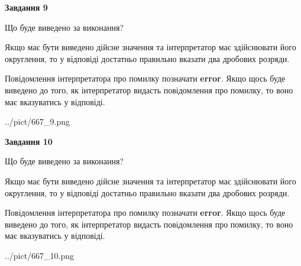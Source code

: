 \documentclass[12pt, ukrainian]{article}
\begin{document}
{\begin {Large}
{\begin {center}\textbf{Завдання 9}\end {center}}\par
Що буде виведено за виконання? \par

Якщо має бути виведено дійсне значення та інтерпретатор має здійснювати його округлення, 
то у відповіді достатньо правильно вказати два дробових розряди.

Повідомлення інтерпретатора про помилку позначати \textbf{error}.
Якщо щось буде виведено до того, як інтерпретатор видасть повідомлення про помилку, 
то воно має вказуватись у відповіді. \par

\begin{center}
	{../pict/667_9.png}
\end{center}
\newpage

{\begin {center}\textbf{Завдання 10}\end {center}}\par
Що буде виведено за виконання? \par

Якщо має бути виведено дійсне значення та інтерпретатор має здійснювати його округлення, 
то у відповіді достатньо правильно вказати два дробових розряди.

Повідомлення інтерпретатора про помилку позначати \textbf{error}.
Якщо щось буде виведено до того, як інтерпретатор видасть повідомлення про помилку, 
то воно має вказуватись у відповіді. \par

\begin{center}
	{../pict/667_10.png}
\end{center}
\newpage

\end {Large}}
\end{document}
